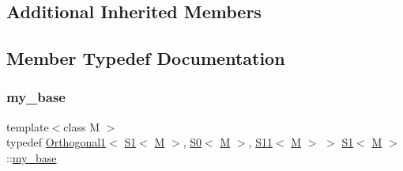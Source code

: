 \subsection*{Additional Inherited Members}


\subsection{Member Typedef Documentation}
\mbox{\label{struct_s1_a61df79a9bb93c0317d33b9602244cdf7}} 
\subsubsection{\texorpdfstring{my\+\_\+base}{my\_base}}
{\footnotesize\ttfamily template$<$class M $>$ \\
typedef \mbox{\hyperlink{struct_orthogonal1}{Orthogonal1}}$<$ \mbox{\hyperlink{struct_s1}{S1}}$<$ \mbox{\hyperlink{struct_m}{M}} $>$, \mbox{\hyperlink{struct_s0}{S0}}$<$ \mbox{\hyperlink{struct_m}{M}} $>$, \mbox{\hyperlink{struct_s11}{S11}}$<$ \mbox{\hyperlink{struct_m}{M}} $>$ $>$ \mbox{\hyperlink{struct_s1}{S1}}$<$ \mbox{\hyperlink{struct_m}{M}} $>$\+::\mbox{\hyperlink{struct_s1_a61df79a9bb93c0317d33b9602244cdf7}{my\+\_\+base}}}

\mbox{\label{struct_s1_a3da743f3095f20881e0a197c37f7f91f}} 
